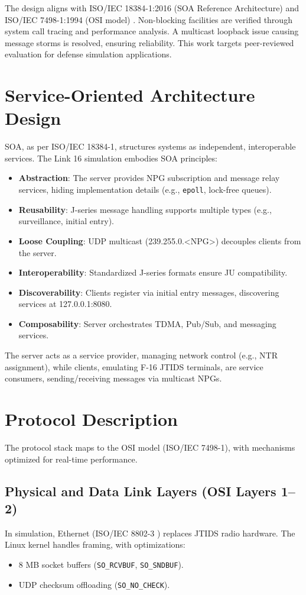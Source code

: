 \documentclass{article}
\begin{document}
The design aligns with ISO/IEC 18384-1:2016 (SOA Reference Architecture) \cite{iso18384} and ISO/IEC 7498-1:1994 (OSI model) \cite{iso7498}. Non-blocking facilities are verified through system call tracing and performance analysis. A multicast loopback issue causing message storms is resolved, ensuring reliability. This work targets peer-reviewed evaluation for defense simulation applications.

\section{Service-Oriented Architecture Design}
SOA, as per ISO/IEC 18384-1, structures systems as independent, interoperable services. The Link 16 simulation embodies SOA principles:

\begin{itemize}
    \item \textbf{Abstraction}: The server provides NPG subscription and message relay services, hiding implementation details (e.g., \texttt{epoll}, lock-free queues).
    \item \textbf{Reusability}: J-series message handling supports multiple types (e.g., surveillance, initial entry).
    \item \textbf{Loose Coupling}: UDP multicast (239.255.0.<NPG>) decouples clients from the server.
    \item \textbf{Interoperability}: Standardized J-series formats ensure JU compatibility.
    \item \textbf{Discoverability}: Clients register via initial entry messages, discovering services at 127.0.0.1:8080.
    \item \textbf{Composability}: Server orchestrates TDMA, Pub/Sub, and messaging services.
\end{itemize}

The server acts as a service provider, managing network control (e.g., NTR assignment), while clients, emulating F-16 JTIDS terminals, are service consumers, sending/receiving messages via multicast NPGs.

\section{Protocol Description}
The protocol stack maps to the OSI model (ISO/IEC 7498-1), with mechanisms optimized for real-time performance.

\subsection{Physical and Data Link Layers (OSI Layers 1--2)}
In simulation, Ethernet (ISO/IEC 8802-3 \cite{iso8802}) replaces JTIDS radio hardware. The Linux kernel handles framing, with optimizations:
\begin{itemize}
    \item 8 MB socket buffers (\texttt{SO\_RCVBUF}, \texttt{SO\_SNDBUF}).
    \item UDP checksum offloading (\texttt{SO\_NO\_CHECK}).
\end{itemize}
\end{document}

